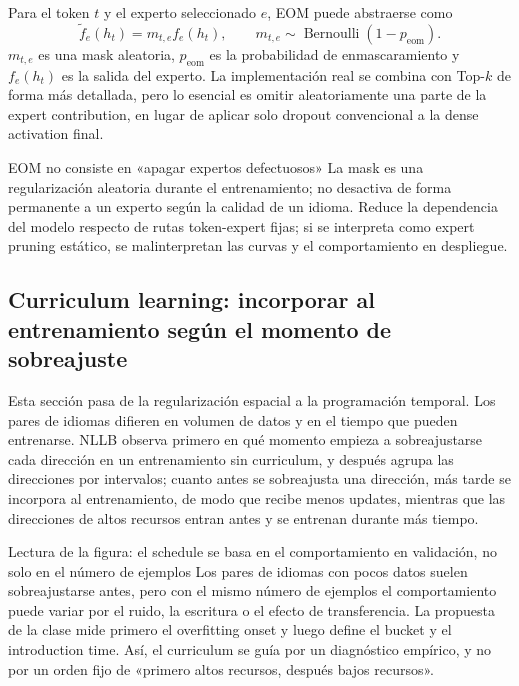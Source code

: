 Para el token $t$ y el experto seleccionado $e$, EOM puede abstraerse como
\[
\widetilde{f}_e(h_t)=m_{t,e}f_e(h_t),\qquad
m_{t,e}\sim\operatorname{Bernoulli}(1-p_{\text{eom}}).
\]
$m_{t,e}$ es una mask aleatoria, $p_{\text{eom}}$ es la probabilidad de enmascaramiento y $f_e(h_t)$ es la salida del experto. La implementación real se combina con Top-$k$ de forma más detallada, pero lo esencial es omitir aleatoriamente una parte de la expert contribution, en lugar de aplicar solo dropout convencional a la dense activation final.

\begin{warningbox}{EOM no consiste en «apagar expertos defectuosos»}
La mask es una regularización aleatoria durante el entrenamiento; no desactiva de forma permanente a un experto según la calidad de un idioma. Reduce la dependencia del modelo respecto de rutas token-expert fijas; si se interpreta como expert pruning estático, se malinterpretan las curvas y el comportamiento en despliegue.
\end{warningbox}


\subsection{Curriculum learning: incorporar al entrenamiento según el momento de sobreajuste}

Esta sección pasa de la regularización espacial a la programación temporal. Los pares de idiomas difieren en volumen de datos y en el tiempo que pueden entrenarse. NLLB observa primero en qué momento empieza a sobreajustarse cada dirección en un entrenamiento sin curriculum, y después agrupa las direcciones por intervalos; cuanto antes se sobreajusta una dirección, más tarde se incorpora al entrenamiento, de modo que recibe menos updates, mientras que las direcciones de altos recursos entran antes y se entrenan durante más tiempo.


\begin{knowledgebox}{Lectura de la figura: el schedule se basa en el comportamiento en validación, no solo en el número de ejemplos}
Los pares de idiomas con pocos datos suelen sobreajustarse antes, pero con el mismo número de ejemplos el comportamiento puede variar por el ruido, la escritura o el efecto de transferencia. La propuesta de la clase mide primero el overfitting onset y luego define el bucket y el introduction time. Así, el curriculum se guía por un diagnóstico empírico, y no por un orden fijo de «primero altos recursos, después bajos recursos».
\end{knowledgebox}

